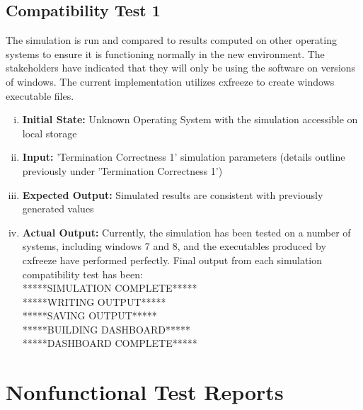 \documentclass[paper=letter, fontsize=10pt]{scrartcl}
\numberwithin{equation}{section}		%
\numberwithin{figure}{section}			%
\numberwithin{table}{section}				%
\begin{document}
\subsection{Compatibility Test 1} %
The simulation is run and compared to results computed on other operating systems to ensure it is functioning normally in the new environment. The stakeholders have indicated that they will only be using the software on versions of windows. The current implementation utilizes cxfreeze to create windows executable files. 
\begin{enumerate}[(i)]
	\item \textbf{Initial State:} Unknown Operating System with the simulation accessible on local storage
	\item \textbf{Input:} 'Termination Correctness 1' simulation parameters (details outline previously under 'Termination Correctness 1')
	\item \textbf{Expected Output:} Simulated results are consistent with previously generated values
	\item \textbf{Actual Output:} Currently, the simulation has been tested on a number of systems, including windows 7 and 8, and the executables produced by cxfreeze have performed perfectly. Final output from each simulation compatibility test has been: \\
	*****SIMULATION COMPLETE*****\\
	*****WRITING OUTPUT*****\\
	*****SAVING OUTPUT*****\\
	*****BUILDING DASHBOARD*****\\
	*****DASHBOARD COMPLETE*****\\
\end{enumerate}

\section{Nonfunctional Test Reports}
\end{document}
